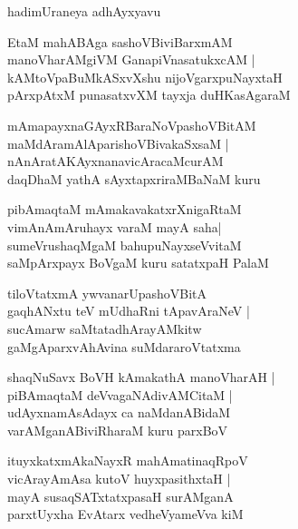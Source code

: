 \documentclass[twoside,12pt,openright]{book}
\newcounter{shloka}[chapter]
\begin{document}
\begin{center}
hadimUraneya adhAyxyavu
\end{center}

\begin{shloka}%
EtaM mahABAga sashoVBiviBarxmAM \\
manoVharAMgiVM GanapiVnasatukxcAM |\\
kAMtoVpaBuMkASxvXshu nijoVgarxpuNayxtaH \\
pArxpAtxM punasatxvXM tayxja duHKasAgaraM 
\end{shloka}

\begin{shloka}%
mAmapayxnaGAyxRBaraNoVpashoVBitAM \\
maMdAramAlAparishoVBivakaSxsaM |\\
nAnAratAKAyxnanavicAracaMcurAM \\
daqDhaM yathA sAyxtapxriraMBaNaM kuru
\end{shloka}

\begin{shloka}%
pibAmaqtaM mAmakavakatxrXnigaRtaM \\
vimAnAmAruhayx varaM mayA saha|\\
sumeVrushaqMgaM bahupuNayxseVvitaM \\
saMpArxpayx BoVgaM kuru satatxpaH PalaM 
\end{shloka}

\begin{shloka}%
tiloVtatxmA ywvanarUpashoVBitA\\
gaqhANxtu teV mUdhaRni tApavAraNeV |\\
sucAmarw saMtatadhArayAMkitw \\
gaMgAparxvAhAvina suMdararoVtatxma
\end{shloka}

\begin{shloka}%
shaqNuSavx BoVH kAmakathA manoVharAH |\\
piBAmaqtaM deVvagaNAdivAMCitaM |\\
udAyxnamAsAdayx ca naMdanABidaM \\
varAMganABiviRharaM kuru parxBoV 
\end{shloka}

\begin{shloka}%
ituyxkatxmAkaNayxR mahAmatinaqRpoV \\
vicArayAmAsa kutoV huyxpasithxtaH |\\
mayA susaqSATxtatxpasaH surAMganA \\
parxtUyxha EvAtarx vedheVyameVva kiM 
\end{shloka}
\end{document}
